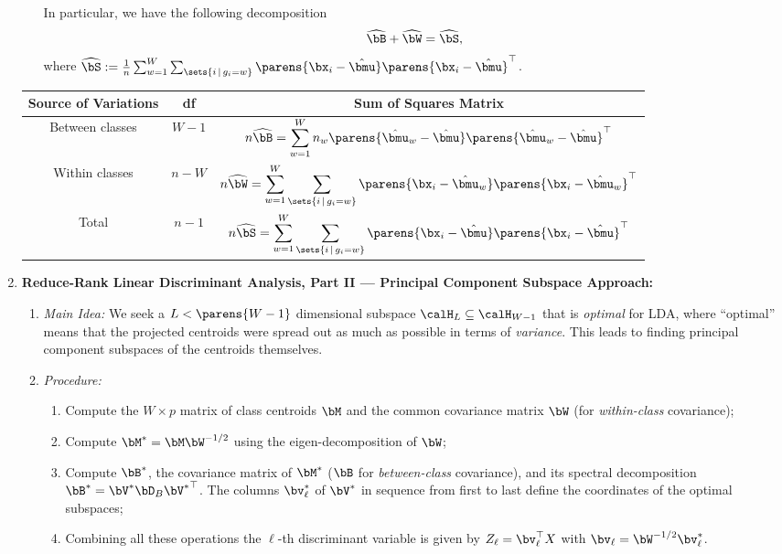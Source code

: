 \documentclass[12pt]{article}
\begin{document}
\begin{enumerate}[label=\textbf{\arabic*.}]
\begin{enumerate}
		In particular, we have the following decomposition 
		\begin{align*}
			\widehat{\bB} + \widehat{\bW} = \widehat{\bS}, 
		\end{align*}
		where $\widehat{\bS} := \frac{1}{n} \sum_{w=1}^W \sum_{\sets{i \,\vert\, g_i = w}} \parens{\bx_i - \hat{\bmu}} \parens{\bx_i - \hat{\bmu}}^\top$. 
		
	\end{enumerate}
	
	\begin{center}
		\begin{tabular}{*{3}{c}}
			\toprule
			Source of Variations & df & Sum of Squares Matrix \\
			\midrule
			Between classes & $W - 1$ & $\displaystyle n \widehat{\bB} = \sum_{w=1}^W n_w \parens{\hat{\bmu}_w - \hat{\bmu}} \parens{\hat{\bmu}_w - \hat{\bmu}}^\top $ \\
			Within classes & $n - W$ & $\displaystyle n \widehat{\bW} = \sum_{w=1}^W \sum_{\sets{i \,\vert\, g_i = w}} \parens{\bx_i - \hat{\bmu}_w} \parens{\bx_i - \hat{\bmu}_w}^\top$ \\
			\midrule 
			Total & $n-1$ & $\displaystyle n \widehat{\bS} = \sum_{w=1}^W \sum_{\sets{i \,\vert\, g_i = w}} \parens{\bx_i - \hat{\bmu}} \parens{\bx_i - \hat{\bmu}}^\top$ \\
			\bottomrule
		\end{tabular}
	\end{center}
	
	\item \textbf{Reduce-Rank Linear Discriminant Analysis, Part II --- Principal Component Subspace Approach:} 
	\begin{enumerate}
		\item \textit{Main Idea:} We seek a $L < \parens{W - 1}$ dimensional subspace $\calH_L \subseteq \calH_{W - 1}$ that is \emph{optimal} for LDA, where ``optimal'' means that the projected centroids were spread out as much as possible in terms of \emph{variance}. This leads to finding principal component subspaces of the centroids themselves. 
		\item \textit{Procedure:}
		\begin{enumerate}
			\item Compute the $ W \times p $ matrix of class centroids $\bM$ and the common covariance matrix $\bW$ (for \textit{within-class} covariance); 
			\item Compute $\bM^* = \bM \bW^{-1/2}$ using the eigen-decomposition of $\bW$; 
			\item Compute $\bB^*$, the covariance matrix of $\bM^*$ ($\bB$ for \textit{between-class} covariance), and its spectral decomposition $\bB^* = \bV^* \bD_B {\bV^*}^\top$. The columns $\bv_{\ell}^*$ of $\bV^*$ in sequence from first to last define the coordinates of the optimal subspaces; 
			\item Combining all these operations the $\ell$-th discriminant variable is given by $Z_{\ell} = \bv_{\ell}^\top X$ with $\bv_{\ell} = \bW^{-1/2} \bv_\ell^*$. 
		\end{enumerate}
		

\end{enumerate}
\end{enumerate}
\end{document}
